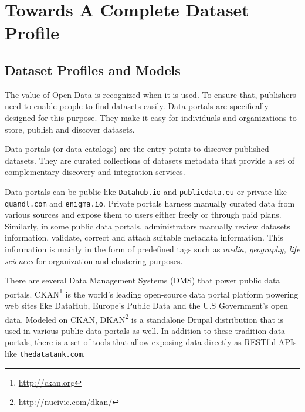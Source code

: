 \documentclass[a4paper,11pt,twoside]{ThesisStyle}
\begin{document}
\let\cleardoublepage\clearpage\let\cleardoublepage\clearpage
\chapter{Towards A Complete Dataset Profile}\label{chapter:1}


\section{Dataset Profiles and Models}\label{chapter:hdl}

The value of Open Data is recognized when it is used. To ensure that, publishers need to enable people to find datasets easily. Data portals are specifically designed for this purpose. They make it easy for individuals and organizations to store, publish and discover datasets.

Data portals (or data catalogs) are the entry points to discover published datasets. They are curated collections of datasets metadata that provide a set of complementary discovery and integration  services.

Data portals can be public like \texttt{Datahub.io} and \texttt{publicdata.eu} or private like \texttt{quandl.com} and \texttt{enigma.io}. Private portals harness manually curated data from various sources and expose them to users either freely or through paid plans. Similarly, in some public data portals, administrators manually review datasets information, validate, correct and attach suitable metadata information. This information is mainly in the form of predefined tags such as \textit{media, geography, life sciences} for organization and clustering purposes.

There are several Data Management Systems (DMS) that power public data portals. CKAN\footnote{\url{http://ckan.org}} is the world's leading open-source data portal platform powering web sites like DataHub, Europe's Public Data and the U.S Government's open data. Modeled on CKAN, DKAN\footnote{\url{http://nucivic.com/dkan/}} is a standalone Drupal distribution that is used in various public data portals as well. In addition to these tradition data portals, there is a set of tools that allow exposing data directly as RESTful APIs like \texttt{thedatatank.com}.
\end{document}
